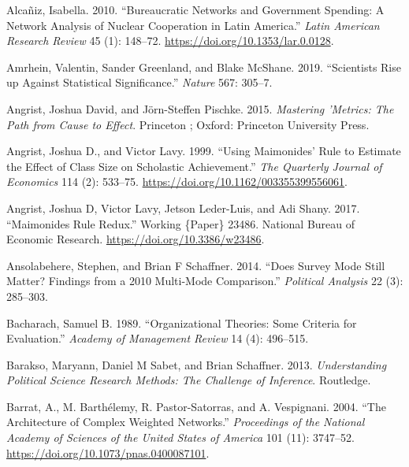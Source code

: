 \documentclass{book}
\newlength{\cslhangindent}
\newlength{\cslentryspacingunit} %
\newenvironment{CSLReferences}[2] %
 {%
  \setlength{\parindent}{0pt}
  \ifodd #1
  \let\oldpar\par
  \def\par{\hangindent=\cslhangindent\oldpar}
  \fi
  \setlength{\parskip}{#2\cslentryspacingunit}
 }%
 {}
\begin{document}
\hypertarget{refs}{}
\begin{CSLReferences}{1}{0}
\leavevmode{}%
Alcañiz, Isabella. 2010. {``Bureaucratic Networks and Government Spending: A
Network Analysis of Nuclear Cooperation in Latin America.''} \emph{Latin
American Research Review} 45 (1): 148--72.
\url{https://doi.org/10.1353/lar.0.0128}.

\leavevmode{}%
Amrhein, Valentin, Sander Greenland, and Blake McShane. 2019. {``Scientists
Rise up Against Statistical Significance.''} \emph{Nature} 567: 305--7.

\leavevmode{}%
Angrist, Joshua David, and Jörn-Steffen Pischke. 2015. \emph{Mastering
'Metrics: The Path from Cause to Effect}. {Princeton ; Oxford}: {Princeton
University Press}.

\leavevmode{}%
Angrist, Joshua D., and Victor Lavy. 1999. {``Using {Maimonides}' {Rule} to
{Estimate} the {Effect} of {Class} {Size} on {Scholastic} {Achievement}.''}
\emph{The Quarterly Journal of Economics} 114 (2): 533--75.
\url{https://doi.org/10.1162/003355399556061}.

\leavevmode{}%
Angrist, Joshua D, Victor Lavy, Jetson Leder-Luis, and Adi Shany. 2017.
{``Maimonides {Rule} {Redux}.''} Working \{Paper\} 23486. National Bureau of
Economic Research. \url{https://doi.org/10.3386/w23486}.

\leavevmode{}%
Ansolabehere, Stephen, and Brian F Schaffner. 2014. {``Does Survey Mode Still
Matter? Findings from a 2010 Multi-Mode Comparison.''} \emph{Political
Analysis} 22 (3): 285--303.

\leavevmode{}%
Bacharach, Samuel B. 1989. {``Organizational {Theories}: {Some Criteria} for
{Evaluation}.''} \emph{Academy of Management Review} 14 (4): 496--515.

\leavevmode{}%
Barakso, Maryann, Daniel M Sabet, and Brian Schaffner. 2013.
\emph{Understanding Political Science Research Methods: The Challenge of
Inference}. Routledge.

\leavevmode{}%
Barrat, A., M. Barthélemy, R. Pastor-Satorras, and A. Vespignani. 2004. {``The
Architecture of Complex Weighted Networks.''} \emph{Proceedings of the
National Academy of Sciences of the United States of America} 101 (11):
3747--52. \url{https://doi.org/10.1073/pnas.0400087101}.


\end{CSLReferences}
\end{document}
